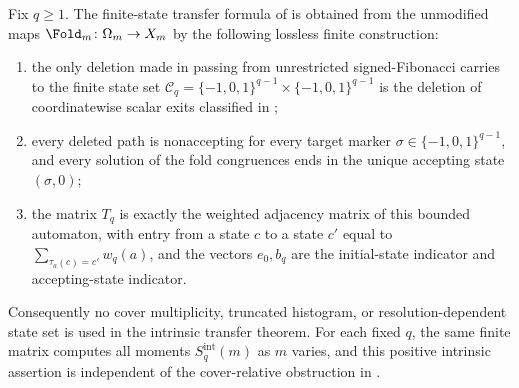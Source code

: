 \begin{theorem}
\label{thm:audited-fixed-degree-transfer-interface}
Fix \(q\ge1\).  The finite-state transfer formula of
 is obtained from the unmodified maps
\(\Fold_m\colon\Omega_m\to X_m\) by the following lossless finite construction:
\begin{enumerate}
\item the only deletion made in passing from unrestricted signed-Fibonacci
  carries to the finite state set
  \(\mathcal C_q=\{-1,0,1\}^{q-1}\times\{-1,0,1\}^{q-1}\) is the deletion of
  coordinatewise scalar exits classified in
  ;
\item every deleted path is nonaccepting for every target marker
  \(\sigma\in\{-1,0,1\}^{q-1}\), and every solution of the fold congruences ends
  in the unique accepting state \((\sigma,0)\);
\item the matrix \(T_q\) is exactly the weighted adjacency matrix of this bounded
  automaton, with entry from a state \(c\) to a state \(c'\) equal to
  \(\sum_{\tau_a(c)=c'}w_q(a)\), and the vectors \(e_0,b_q\) are the
  initial-state indicator and accepting-state indicator.
\end{enumerate}
Consequently no cover multiplicity, truncated histogram, or resolution-dependent
state set is used in the intrinsic transfer theorem.  For each fixed \(q\), the
same finite matrix computes all moments \(S_q^{\mathrm{int}}(m)\) as \(m\)
varies, and this positive intrinsic assertion is independent of the
cover-relative obstruction in .
\end{theorem}


